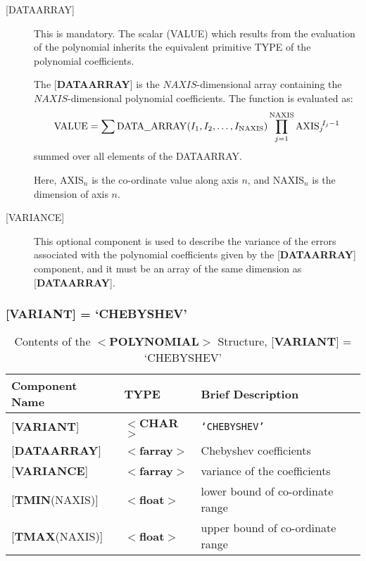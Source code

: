 \documentclass[twoside,11pt]{article}
\renewcommand{\_}{\texttt{\symbol{95}}}
\begin{document}
\begin{description}
\item [{[}DATA\_ARRAY{]}] This is mandatory.  The scalar (VALUE) which
results from the evaluation of the polynomial inherits the equivalent
primitive TYPE of the polynomial coefficients.

The {[}{\bf DATA\_ARRAY}{]} is the $NAXIS$-dimensional array
containing the $NAXIS$-di\-men\-sion\-al poly\-no\-mial
co\-efficients.  The function is evaluated as:
\[{\rm VALUE} = \sum {\rm DATA\underline{~~}ARRAY}(I_1,I_2,\ldots,I_{\rm NAXIS}) \prod_{j=1}^{\rm NAXIS} {\rm AXIS}_j\!^{I_j-1} \]
summed over all elements of the DATA\_ARRAY.

Here, AXIS$_n$ is the co-ordinate value along axis $n$, and NAXIS$_n$
is the dimension of axis $n$.

\item [{[}VARIANCE{]}]  This optional component is used to describe the
variance of the errors associated with the polynomial coefficients
given by the {[}{\bf DATA\_ARRAY}{]} component, and it must be an
array of the same dimension as {[}{\bf DATA\_ARRAY}{]}.

\end{description}

\subsubsection{{[}{\bf VARIANT}{]} = `CHEBYSHEV'}

\begin{table}[hbt]
\centering
\caption{Contents of the $<${\bf POLYNOMIAL}$>$ Structure,
               {[}{\bf VARIANT}{]} = `CHEBYSHEV'}
\begin{tabular}{|l|l|l|}
\hline
Component Name & TYPE & Brief Description \\ \hline
{[}{\bf VARIANT}{]} & $<${\bf \_CHAR}$>$ & {\tt `CHEBYSHEV'} \\
{[}{\bf DATA\_ARRAY}{]} & $<${\bf farray}$>$ & Chebyshev coefficients \\
{[}{\bf VARIANCE}{]}  & $<${\bf farray}$>$ & variance of the coefficients \\
{[}{\bf TMIN}(NAXIS){]} & $<${\bf float}$>$ & lower bound of co-ordinate range\\
{[}{\bf TMAX}(NAXIS){]} & $<${\bf float}$>$ & upper bound of co-ordinate range\\ \hline
\end{tabular}
\end{table}
\end{document}
